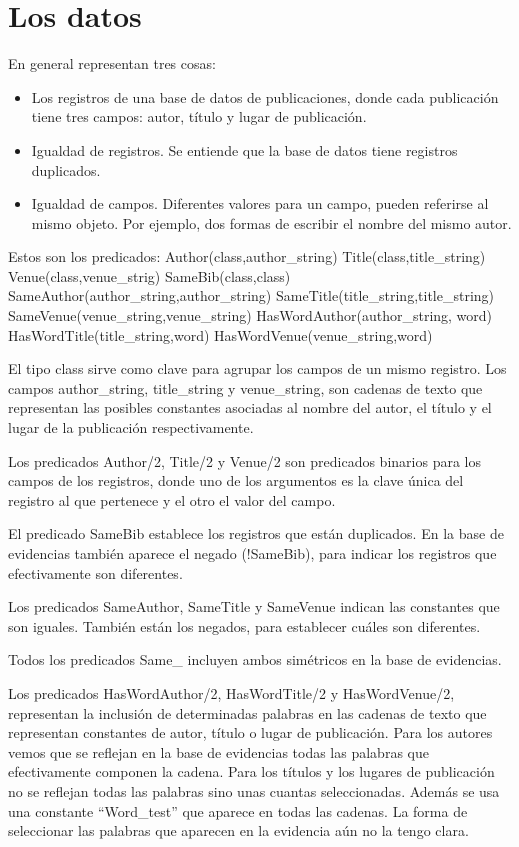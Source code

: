 \section{Los datos}

En general representan tres cosas:

\begin{itemize}
\item Los registros de una base de datos de publicaciones, donde cada publicación tiene tres campos: autor, título y lugar de publicación.
\item Igualdad de registros. Se entiende que la base de datos tiene registros duplicados.
\item Igualdad de campos. Diferentes valores para un campo, pueden referirse al mismo objeto. Por ejemplo, dos formas de escribir el nombre del mismo autor.
\end{itemize}

Estos son los predicados:
Author(class,author\_string)
Title(class,title\_string)
Venue(class,venue\_strig)
SameBib(class,class)
SameAuthor(author\_string,author\_string)
SameTitle(title\_string,title\_string)
SameVenue(venue\_string,venue\_string)
HasWordAuthor(author\_string, word)
HasWordTitle(title\_string,word)
HasWordVenue(venue\_string,word)

El tipo class sirve como clave para agrupar los campos de un mismo registro. Los campos author\_string, title\_string y venue\_string, son cadenas de texto que representan las posibles constantes asociadas al nombre del autor, el título y el lugar de la publicación respectivamente.

Los predicados Author/2, Title/2 y Venue/2 son predicados binarios para los campos de los registros, donde uno de los argumentos es la clave única del registro al que pertenece y el otro el valor del campo.

El predicado SameBib establece los registros que están duplicados. En la base de evidencias también aparece el negado (!SameBib), para indicar los registros que efectivamente son diferentes.

Los predicados SameAuthor, SameTitle y SameVenue indican las constantes que son iguales. También están los negados, para establecer cuáles son diferentes.

Todos los predicados Same\_  incluyen ambos simétricos en la base de evidencias.

Los predicados HasWordAuthor/2, HasWordTitle/2 y HasWordVenue/2, representan la inclusión de determinadas palabras en las cadenas de texto que representan constantes de autor, título o lugar de publicación. Para los autores vemos que se reflejan en la base de evidencias todas las palabras que efectivamente componen la cadena. Para los títulos y los lugares de publicación no se reflejan todas las palabras sino unas cuantas seleccionadas. Además se usa una constante ``Word\_test'' que aparece en todas las cadenas. La forma de seleccionar las palabras que aparecen en la evidencia aún no la tengo clara. 

